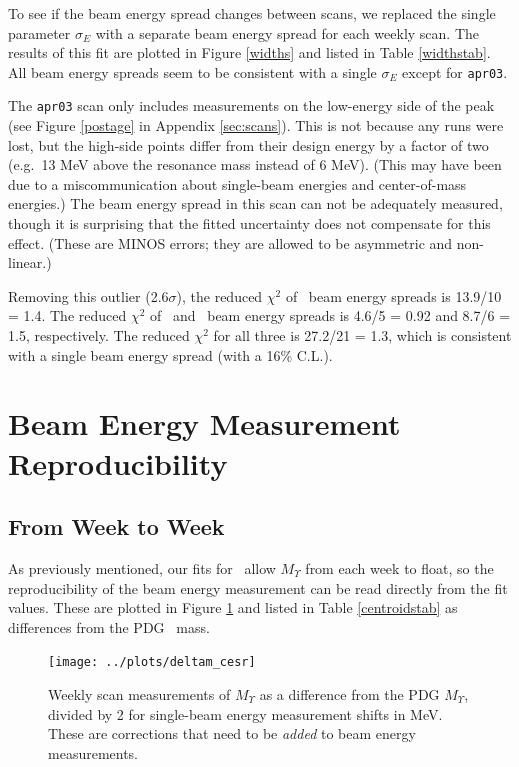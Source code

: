 \documentclass[aps,prd,preprint,superscriptaddress,tightenlines,nofootinbib,floatfix]{revtex4}
\begin{document}
To see if the beam energy spread changes between scans, we replaced the
single parameter $\sigma_E$ with a separate beam energy spread for
each weekly scan.  The results of this fit are plotted in Figure
\ref{widths} and listed in Table \ref{widthstab}.  All beam energy
spreads seem to be consistent with a single $\sigma_E$ except for
{\tt apr03}.

The {\tt apr03} scan only includes measurements on the low-energy side
of the peak (see Figure \ref{postage} in Appendix \ref{sec:scans}).
This is not because any runs were lost, but the high-side points
differ from their design energy by a factor of two (e.g.\ 13 MeV above
the resonance mass instead of 6 MeV).  (This may have been due to a
miscommunication about single-beam energies and center-of-mass
energies.)  The beam energy spread in this scan can not be adequately
measured, though it is surprising that the fitted uncertainty does not
compensate for this effect.  (These are MINOS errors; they are allowed
to be asymmetric and non-linear.)

Removing this outlier (2.6$\sigma$), the reduced $\chi^2$ of \uone\
beam energy spreads is 13.9/10 = 1.4.  The reduced $\chi^2$ of \utwo\
and \uthree\ beam energy spreads is 4.6/5 = 0.92 and 8.7/6 = 1.5,
respectively.  The reduced $\chi^2$ for all three is 27.2/21 = 1.3,
which is consistent with a single beam energy spread (with a 16\%
C.L.).

\section{Beam Energy Measurement Reproducibility}

\subsection {From Week to Week} \label{sec:weekly}

As previously mentioned, our fits for \gee\ allow $M_\Upsilon$ from
each week to float, so the reproducibility of the beam energy
measurement can be read directly from the fit values.  These are
plotted in Figure \ref{centroids} and listed in Table
\ref{centroidstab} as differences from the PDG \ups\ mass.

\begin{figure}[p]
  \texttt{[image: ../plots/deltam\_cesr]}
  \caption{\label{centroids} Weekly scan measurements of $M_\Upsilon$
    as a difference from the PDG $M_\Upsilon$, divided by 2 for
    single-beam energy measurement shifts in MeV.  These are
    corrections that need to be {\it added} to beam energy
    measurements.}
\end{figure}
\end{document}

